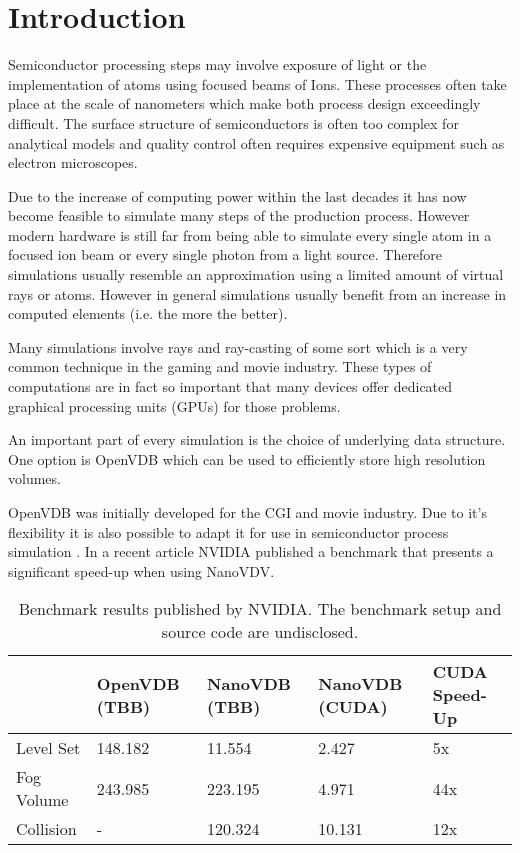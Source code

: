 \section{Introduction}

Semiconductor processing steps may involve exposure of light or the implementation of atoms using focused beams of Ions.
These processes often take place at the scale of nanometers which make both process design exceedingly difficult.
The surface structure of semiconductors is often too complex for analytical models and quality control often requires expensive equipment such as electron microscopes.

Due to the increase of computing power within the last decades it has now become feasible to simulate many steps of the production process.
However modern hardware is still far from being able to simulate every single atom in a focused ion beam or every single photon from a light source.
Therefore simulations usually resemble an approximation using a limited amount of virtual rays or atoms. 
However in general simulations usually benefit from an increase in computed elements (i.e. the more the better).

Many simulations involve rays and ray-casting of some sort which is a very common technique in the gaming and movie industry.
These types of computations are in fact so important that many devices offer dedicated graphical processing units (GPUs) for those problems.



An important part of every simulation is the choice of underlying data structure. 
One option is OpenVDB which can be used to efficiently store high resolution volumes. \cite{openvdb}


OpenVDB was initially developed for the CGI and movie industry. Due to it's flexibility it is also possible to adapt it for use in semiconductor process simulation \cite{manstetten2018efficient}.
In a recent article  NVIDIA published a benchmark that presents a significant speed-up when using NanoVDV.

\begin{table}[H]
\caption{Benchmark results published by NVIDIA. The benchmark setup and source code are undisclosed. \cite{nanovdb_nvidia}}
\centering
\begin{tabular}{@{}lllll@{}}
	\toprule
			& OpenVDB (TBB) & NanoVDB (TBB) & NanoVDB (CUDA) & CUDA Speed-Up \\	\hline
Level Set  & 148.182       & 11.554        & 2.427          & 5x            \\
Fog Volume & 243.985       & 223.195       & 4.971          & 44x           \\
Collision  & -             & 120.324       & 10.131         & 12x          \\ \bottomrule
\end{tabular}
\label{tab:nvidia_benchmark}
\end{table}


